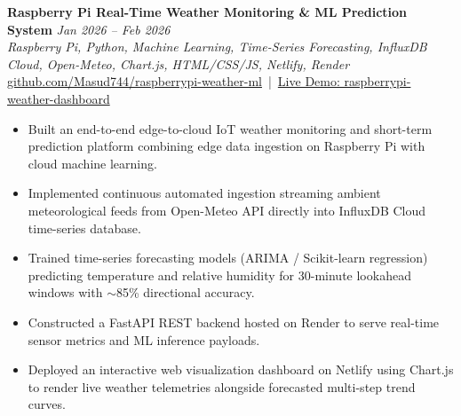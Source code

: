 \documentclass[11pt,a4paper]{article}
\begin{document}
\textbf{Raspberry Pi Real-Time Weather Monitoring \& ML Prediction System} \hfill \textit{Jan 2026 -- Feb 2026} \\
\textit{Raspberry Pi, Python, Machine Learning, Time-Series Forecasting, InfluxDB Cloud, Open-Meteo, Chart.js, HTML/CSS/JS, Netlify, Render} \\
\href{https://github.com/Masud744/raspberrypi-weather-ml}{github.com/Masud744/raspberrypi-weather-ml} \,|\, \href{https://raspberrypi-weather-dashboard.netlify.app/}{Live Demo: raspberrypi-weather-dashboard}
\begin{itemize}
    \item Built an end-to-end edge-to-cloud IoT weather monitoring and short-term prediction platform combining edge data ingestion on Raspberry Pi with cloud machine learning.
    \item Implemented continuous automated ingestion streaming ambient meteorological feeds from Open-Meteo API directly into InfluxDB Cloud time-series database.
    \item Trained time-series forecasting models (ARIMA / Scikit-learn regression) predicting temperature and relative humidity for 30-minute lookahead windows with $\sim$85\% directional accuracy.
    \item Constructed a FastAPI REST backend hosted on Render to serve real-time sensor metrics and ML inference payloads.
    \item Deployed an interactive web visualization dashboard on Netlify using Chart.js to render live weather telemetries alongside forecasted multi-step trend curves.
\end{itemize}

\end{document}
